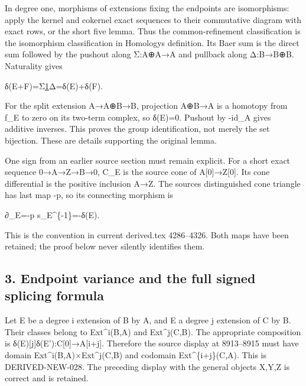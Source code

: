 In degree one,\allowbreak{} morphisms of extensions fixing the endpoints are isomorphisms:\allowbreak{} apply the kernel and cokernel exact sequences to their commutative diagram with exact rows,\allowbreak{} or the short five lemma. Thus the common-refinement classification is the isomorphism classification in Homology\textquotesingle s definition. Its Baer sum is the direct sum followed by the pushout along Σ:\allowbreak{}A\allowbreak{}⊕A\allowbreak{}→A and pullback along Δ:\allowbreak{}B\allowbreak{}→B\allowbreak{}⊕B. Naturality gives

δ(E\allowbreak{}+F)\allowbreak{}\allowbreak{}=Σ\href{δ(E)⊕δ(F)}{1}Δ\allowbreak{}=δ(E)\allowbreak{}\allowbreak{}+δ(F)\allowbreak{}.

For the split extension A\allowbreak{}→A\allowbreak{}⊕B\allowbreak{}→B,\allowbreak{} projection A\allowbreak{}⊕B\allowbreak{}→A is a homotopy from f\_\allowbreak{}E to zero on its two-term complex,\allowbreak{} so δ(E)\allowbreak{}\allowbreak{}=0. Pushout by -id\_\allowbreak{}A gives additive inverses. This proves the group identification,\allowbreak{} not merely the set bijection. These are details supporting the original lemma.

One sign from an earlier source section must remain explicit. For a short exact sequence 0\allowbreak{}→A\allowbreak{}→Z\allowbreak{}→B\allowbreak{}→0,\allowbreak{} C\_\allowbreak{}E is the source cone of A[0]\allowbreak{}\allowbreak{}→Z[0]\allowbreak{}. Its cone differential is the positive inclusion A\allowbreak{}→Z. The source\textquotesingle s distinguished cone triangle has last map -p,\allowbreak{} so its connecting morphism is

∂\_\allowbreak{}E\allowbreak{}=-p s\_\allowbreak{}E\textasciicircum{}\{-1\}\allowbreak{}=-δ(E)\allowbreak{}.

This is the convention in current derived.tex 4286–\allowbreak{}4326. Both maps have been retained; the proof below never silently identifies them.

\subsection{3. Endpoint variance and the full signed splicing formula}\label{proofs-8774-9196-endpoint-variance-and-the-full-signed-splicing-formula}

Let E be a degree i extension of B by A,\allowbreak{} and E\textquotesingle{} a degree j extension of C by B. Their classes belong to Ext\textasciicircum{}i(B,\allowbreak{}A)\allowbreak{} and Ext\textasciicircum{}j(C,\allowbreak{}B)\allowbreak{}. The appropriate composition is δ(E)\allowbreak{}[j]\allowbreak{}δ(E')\allowbreak{}:\allowbreak{}C[0]\allowbreak{}\allowbreak{}→A[i\allowbreak{}+j]\allowbreak{}. Therefore the source display at 8913–\allowbreak{}8915 must have domain Ext\textasciicircum{}i(B,\allowbreak{}A)\allowbreak{}×Ext\textasciicircum{}j(C,\allowbreak{}B)\allowbreak{} and codomain Ext\textasciicircum{}\{i\allowbreak{}+j\}(C,\allowbreak{}A)\allowbreak{}. This is DERIVED-NEW-028. The preceding display with the general objects X,\allowbreak{}Y,\allowbreak{}Z is correct and is retained.

